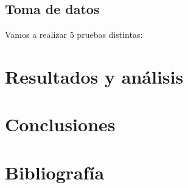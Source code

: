 \subsection{Toma de datos}

Vamos a realizar 5 pruebas distintas:



\section{Resultados y análisis}

\section{Conclusiones}


\section{Bibliografía}






